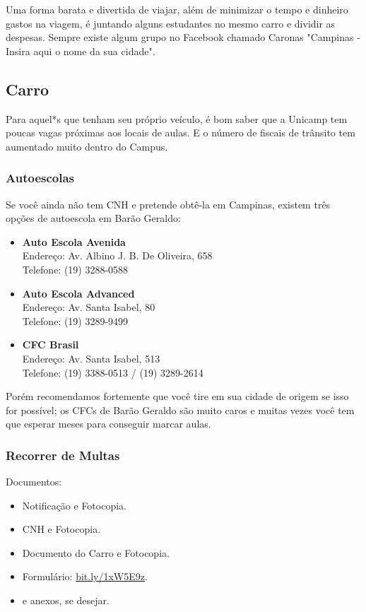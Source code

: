 Uma forma barata e divertida de viajar, além de minimizar o tempo e dinheiro
gastos na viagem, é juntando alguns estudantes no mesmo carro e dividir as
despesas. Sempre existe algum grupo no Facebook chamado Caronas "Campinas -
Insira aqui o nome da sua cidade".

\subsection{Carro}

Para aquel*s que tenham seu próprio veículo, é bom saber que a Unicamp tem
poucas vagas próximas aos locais de aulas. E o número de fiscais de trânsito tem
aumentado muito dentro do Campus.

\subsubsection{Autoescolas}

Se você ainda não tem CNH e pretende obtê-la em Campinas, existem três opções de
autoescola em Barão Geraldo:

\begin{itemize}
    \item \textbf{Auto Escola Avenida}
        \\Endereço: Av. Albino J. B. De Oliveira, 658
        \\Telefone: (19) 3288-0588

    \item \textbf{Auto Escola Advanced}
        \\Endereço: Av. Santa Isabel, 80
        \\Telefone: (19) 3289-9499

    \item \textbf{CFC Brasil}
        \\Endereço: Av. Santa Isabel, 513
        \\Telefone: (19) 3388-0513 / (19) 3289-2614
\end{itemize}

Porém recomendamos fortemente que você tire em sua cidade de origem se isso for
possível; os CFCs de Barão Geraldo são muito caros e muitas vezes você tem que
esperar meses para conseguir marcar aulas.

\subsubsection{Recorrer de Multas}

Documentos:
\begin{itemize}
    \item Notificação e Fotocopia.
    \item CNH e Fotocopia.
    \item Documento do Carro e Fotocopia.
    \item Formulário:
      \url{bit.ly/1xW5E9z}.
    \item e anexos, se desejar.
\end{itemize}

